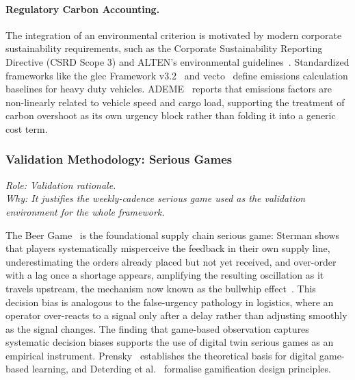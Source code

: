 \paragraph{Regulatory Carbon Accounting.}
The integration of an environmental criterion is motivated by modern corporate sustainability requirements, such as the Corporate Sustainability Reporting Directive (CSRD Scope 3) and ALTEN's environmental guidelines~\autocite{cordova2024green}. Standardized frameworks like the \gls{glec} Framework v3.2~\autocite{smartfreight2023glec} and \gls{vecto}~\autocite{commission2017vecto} define emissions calculation baselines for heavy duty vehicles. ADEME~\autocite{ademe2014impacts} reports that emissions factors are non-linearly related to vehicle speed and cargo load, supporting the treatment of carbon overshoot as its own urgency block rather than folding it into a generic cost term.

\subsubsection{Validation Methodology: Serious Games}
\label{subsec:games}

\noindent\textit{Role: Validation rationale. \\ Why: It justifies the weekly-cadence serious game
used as the validation environment for the whole framework.}

\medskip

The Beer Game~\autocite{sterman1989modeling} is the foundational supply chain serious game: Sterman shows that players systematically misperceive the feedback in their own supply line, underestimating the orders already placed but not yet received, and over-order with a lag once a shortage appears, amplifying the resulting oscillation as it travels upstream, the mechanism now known as the bullwhip effect~\autocite{lee1997bullwhip}. This decision bias is analogous to the false-urgency pathology in logistics, where an operator over-reacts to a signal only after a delay rather than adjusting smoothly as the signal changes. The finding that game-based observation captures systematic decision biases supports the use of digital twin serious games as an empirical instrument. Prensky~\autocite{prensky2001digital} establishes the theoretical basis for digital game-based learning, and Deterding et al.~\autocite{deterding2011game} formalise gamification design principles.


